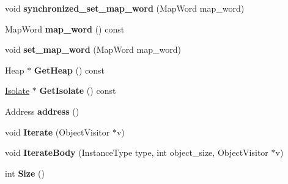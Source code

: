 \begin{DoxyCompactItemize}
\item 
\hypertarget{classv8_1_1internal_1_1_heap_object_a5a925ad87d656bf9a6f714b1d1ac6a49}{}void {\bfseries synchronized\+\_\+set\+\_\+map\+\_\+word} (Map\+Word map\+\_\+word)\label{classv8_1_1internal_1_1_heap_object_a5a925ad87d656bf9a6f714b1d1ac6a49}

\item 
\hypertarget{classv8_1_1internal_1_1_heap_object_a33d0b5f67639225d2f3072001c181864}{}Map\+Word {\bfseries map\+\_\+word} () const \label{classv8_1_1internal_1_1_heap_object_a33d0b5f67639225d2f3072001c181864}

\item 
\hypertarget{classv8_1_1internal_1_1_heap_object_ac765f37bdbe72ec7ebf00483cfa1c8d5}{}void {\bfseries set\+\_\+map\+\_\+word} (Map\+Word map\+\_\+word)\label{classv8_1_1internal_1_1_heap_object_ac765f37bdbe72ec7ebf00483cfa1c8d5}

\item 
\hypertarget{classv8_1_1internal_1_1_heap_object_a8a7809cf288fc0097bfa232ce62a696e}{}Heap $\ast$ {\bfseries Get\+Heap} () const \label{classv8_1_1internal_1_1_heap_object_a8a7809cf288fc0097bfa232ce62a696e}

\item 
\hypertarget{classv8_1_1internal_1_1_heap_object_a844af926eaabef23dd65185c3c51f978}{}\hyperlink{classv8_1_1internal_1_1_isolate}{Isolate} $\ast$ {\bfseries Get\+Isolate} () const \label{classv8_1_1internal_1_1_heap_object_a844af926eaabef23dd65185c3c51f978}

\item 
\hypertarget{classv8_1_1internal_1_1_heap_object_a6969394bb5c9119fd1a23ec6bedda74d}{}Address {\bfseries address} ()\label{classv8_1_1internal_1_1_heap_object_a6969394bb5c9119fd1a23ec6bedda74d}

\item 
\hypertarget{classv8_1_1internal_1_1_heap_object_ad87e32c09e00dd3f4470bbb4db518968}{}void {\bfseries Iterate} (Object\+Visitor $\ast$v)\label{classv8_1_1internal_1_1_heap_object_ad87e32c09e00dd3f4470bbb4db518968}

\item 
\hypertarget{classv8_1_1internal_1_1_heap_object_a3e14da87e4be1ebc47aa8f2ee77ea1a4}{}void {\bfseries Iterate\+Body} (Instance\+Type type, int object\+\_\+size, Object\+Visitor $\ast$v)\label{classv8_1_1internal_1_1_heap_object_a3e14da87e4be1ebc47aa8f2ee77ea1a4}

\item 
\hypertarget{classv8_1_1internal_1_1_heap_object_a53f4a8784ede9710d87dec27abb0a91d}{}int {\bfseries Size} ()\label{classv8_1_1internal_1_1_heap_object_a53f4a8784ede9710d87dec27abb0a91d}


\end{DoxyCompactItemize}

